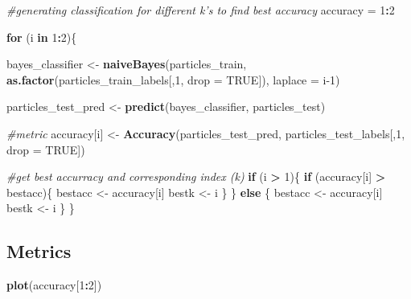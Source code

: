 \documentclass[
]{article}
\newenvironment{Shaded}{\begin{snugshade}}{\end{snugshade}}
\newcommand{\CommentTok}[1]{\textcolor[rgb]{0.56,0.35,0.01}{\textit{#1}}}
\newcommand{\ControlFlowTok}[1]{\textcolor[rgb]{0.13,0.29,0.53}{\textbf{#1}}}
\newcommand{\DataTypeTok}[1]{\textcolor[rgb]{0.13,0.29,0.53}{#1}}
\newcommand{\DecValTok}[1]{\textcolor[rgb]{0.00,0.00,0.81}{#1}}
\newcommand{\KeywordTok}[1]{\textcolor[rgb]{0.13,0.29,0.53}{\textbf{#1}}}
\newcommand{\NormalTok}[1]{#1}
\newcommand{\OperatorTok}[1]{\textcolor[rgb]{0.81,0.36,0.00}{\textbf{#1}}}
\newcommand{\OtherTok}[1]{\textcolor[rgb]{0.56,0.35,0.01}{#1}}
\newcommand{\StringTok}[1]{\textcolor[rgb]{0.31,0.60,0.02}{#1}}
\begin{document}
\begin{Shaded}
\begin{Highlighting}[]
\CommentTok{#generating classification for different k's to find best accuracy}
\NormalTok{accuracy =}\StringTok{ }\DecValTok{1}\OperatorTok{:}\DecValTok{2}

\ControlFlowTok{for}\NormalTok{ (i }\ControlFlowTok{in} \DecValTok{1}\OperatorTok{:}\DecValTok{2}\NormalTok{)\{}

\NormalTok{  bayes_classifier <-}\StringTok{ }\KeywordTok{naiveBayes}\NormalTok{(particles_train, }\KeywordTok{as.factor}\NormalTok{(particles_train_labels[,}\DecValTok{1}\NormalTok{, }\DataTypeTok{drop =} \OtherTok{TRUE}\NormalTok{]), }\DataTypeTok{laplace =}\NormalTok{ i}\DecValTok{-1}\NormalTok{)}

\NormalTok{  particles_test_pred <-}\StringTok{ }\KeywordTok{predict}\NormalTok{(bayes_classifier, particles_test)}
    
  \CommentTok{#metric}
\NormalTok{  accuracy[i] <-}\StringTok{ }\KeywordTok{Accuracy}\NormalTok{(particles_test_pred, particles_test_labels[,}\DecValTok{1}\NormalTok{, }\DataTypeTok{drop =} \OtherTok{TRUE}\NormalTok{])}

\CommentTok{#get best accurracy and corresponding index (k)}
  \ControlFlowTok{if}\NormalTok{ (i }\OperatorTok{>}\StringTok{ }\DecValTok{1}\NormalTok{)\{}
    \ControlFlowTok{if}\NormalTok{ (accuracy[i] }\OperatorTok{>}\StringTok{ }\NormalTok{bestacc)\{}
\NormalTok{      bestacc <-}\StringTok{ }\NormalTok{accuracy[i]}
\NormalTok{      bestk <-}\StringTok{ }\NormalTok{i}
\NormalTok{    \}}
\NormalTok{  \} }\ControlFlowTok{else}\NormalTok{ \{}
\NormalTok{    bestacc <-}\StringTok{ }\NormalTok{accuracy[i]}
\NormalTok{    bestk <-}\StringTok{ }\NormalTok{i}
\NormalTok{  \}}
\NormalTok{\}}
\end{Highlighting}
\end{Shaded}

\hypertarget{metrics-1}{%
\subsection{Metrics}\label{metrics-1}}

\begin{Shaded}
\begin{Highlighting}[]
\KeywordTok{plot}\NormalTok{(accuracy[}\DecValTok{1}\OperatorTok{:}\DecValTok{2}\NormalTok{])}
\end{Highlighting}
\end{Shaded}
\end{document}
